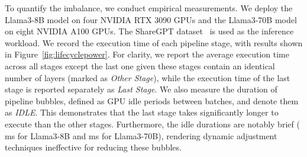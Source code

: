 To quantify the imbalance, we conduct empirical measurements.
We deploy the Llama3-8B model on four NVIDIA RTX 3090 GPUs and the Llama3-70B model on eight NVIDIA A100 GPUs.
The ShareGPT dataset~\cite{chiang2023vicuna} is used as the inference workload.
We record the execution time of each pipeline stage, with results shown in Figure~\ref{fig:lifecyclepower}.
For clarity, we report the average execution time across all stages except the last one given these stages contain an identical number of layers (marked as \emph{Other Stage}), while the execution time of the last stage is reported separately as \emph{Last Stage}.
We also measure the duration of pipeline bubbles, defined as GPU idle periods between batches, and denote them as \emph{IDLE}.
This demonstrates that the last stage takes significantly longer to execute than the other stages.
Furthermore, the idle durations are notably brief ( ms for Llama3-8B and  ms for Llama3-70B), rendering dynamic adjustment techniques ineffective for reducing these bubbles.





